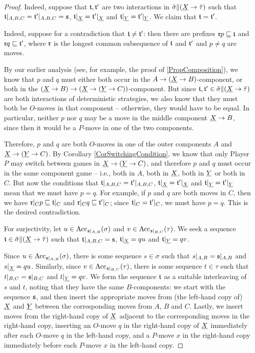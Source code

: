 \begin{proof}
  Indeed, suppose that $\mathfrak t,\mathfrak t'$ are two interactions in $\tilde\sigma\|({\underline{X}} \to \tilde\tau)$ such that $\mathfrak t\vert_{A,B,C}=\mathfrak t'\vert_{A,B,C}=\mathfrak s$, $\mathfrak t\vert_{{\underline{X}}} = \mathfrak t'\vert_{{\underline{X}}}$ and $\mathfrak t\vert_{{\underline{Y}}}=\mathfrak t'\vert_{{\underline{Y}}}$.
  We claim that $\mathfrak t = \mathfrak t'$.

  Indeed, suppose for a contradiction that $\mathfrak t\ne\mathfrak t'$: then there are prefixes $\mathfrak r p\sqsubseteq \mathfrak t$ and $\mathfrak r q \sqsubseteq \mathfrak t'$, where $\mathfrak r$ is the longest common subsequence of $\mathfrak t$ and $\mathfrak t'$ and $p\ne q$ are moves.

  By our earlier analysis (see, for example, the proof of \ref{PropComposition}), we know that $p$ and $q$ must either both occur in the $A \to ({\underline{X}} \to B)$-component, or both in the $({\underline{X}} \to B) \to ({\underline{X}} \to ({\underline{Y}} \to C))$-component.
  But since $\mathfrak t,\mathfrak t'\in\tilde\sigma\|({\underline{X}} \to \tilde\tau)$ are both interactions of deterministic strategies, we also know that they must both be $O$-moves in that component -- otherwise, they would have to be equal.
  In particular, neither $p$ nor $q$ may be a move in the middle component ${\underline{X}} \to B$, since then it would be a $P$-move in one of the two components.

  Therefore, $p$ and $q$ are both $O$-moves in one of the outer components $A$ and ${\underline{X}} \to ({\underline{Y}} \to C)$.  
  By Corollary \ref{CorSwitchingCondition}, we know that only Player $P$ may switch between games in ${\underline{X}} \to ({\underline{Y}} \to C)$, and therefore $p$ and $q$ must occur in the same component game -- i.e., both in $A$, both in ${\underline{X}}$, both in ${\underline{Y}}$ or both in $C$.  
  But now the conditions that $\mathfrak t\vert_{A,B,C}=\mathfrak t'\vert_{A,B,C}$, $\mathfrak t\vert_{{\underline{X}}}=\mathfrak t'\vert_{{\underline{X}}}$ and $\mathfrak t\vert_{{\underline{Y}}}=\mathfrak t'\vert_{{\underline{Y}}}$ mean that we must have $p=q$.  
  For example, if $p$ and $q$ are both moves in $C$, then we have $\mathfrak r\vert_Cp\sqsubseteq\mathfrak t\vert_C$ and $\mathfrak r\vert_Cq\sqsubseteq \mathfrak t'\vert_C$; since $\mathfrak t\vert_C=\mathfrak t'\vert_C$, we must have $p=q$.  
  This is the desired contradiction.

  For surjectivity, let $u\in\operatorname{Acc}_{\mathfrak s\vert_{A,B}}(\sigma)$ and $v\in\operatorname{Acc}_{\mathfrak s\vert_{B,C}}(\tau)$.  
  We seek a sequence $\mathfrak t\in\tilde\sigma\|({\underline{X}} \to \tilde\tau)$ such that $\mathfrak t\vert_{A,B,C}=\mathfrak s$, $\mathfrak t\vert_{{\underline{X}}}=qu$ and $\mathfrak t\vert_{{\underline{Y}}}=qv$.

  Since $u\in\operatorname{Acc}_{\mathfrak s\vert_{A,B}}(\sigma)$, there is some sequence $s\in\sigma$ such that $s\vert_{A,B}=\mathfrak s\vert_{A,B}$ and $s\vert_{{\underline{X}}}=qu$.  
  Similarly, since $v\in\operatorname{Acc}_{\mathfrak s\vert_{B,C}}(\tau)$, there is some sequence $t\in\tau$ such that $t\vert_{B,C}=\mathfrak s\vert_{B,C}$ and $t\vert_{{\underline{Y}}}=qv$.
  We form the sequence $\mathfrak t$ as a suitable interleaving of $s$ and $t$, noting that they have the same $B$-components: we start with the sequence $\mathfrak s$, and then insert the appropriate moves from (the left-hand copy of) ${\underline{X}}$ and ${\underline{Y}}$ between the corresponding moves from $A$, $B$ and $C$.  
  Lastly, we insert moves from the right-hand copy of ${\underline{X}}$ adjacent to the corresponding moves in the right-hand copy, inserting an $O$-move $q$ in the right-hand copy of ${\underline{X}}$ immediately after each $O$-move $q$ in the left-hand copy, and a $P$-move $x$ in the right-hand copy immediately before each $P$-move $x$ in the left-hand copy.


\end{proof}
